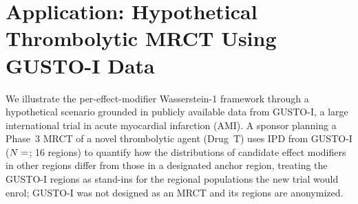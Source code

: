 \documentclass[AMA,Times1COL]{WileyNJDv5}
\begin{document}


\section{Application: Hypothetical Thrombolytic MRCT Using GUSTO-I Data}\label{sec:application}

We illustrate the per-effect-modifier Wasserstein-1 framework through a hypothetical scenario grounded in publicly available data from GUSTO-I, a large international trial in acute myocardial infarction (AMI). A sponsor planning a Phase~3 MRCT of a novel thrombolytic agent (Drug~T) uses IPD from GUSTO-I ($N = \numval{gustoN}$; 16 regions)\cite{gusto1993} to quantify how the distributions of candidate effect modifiers in other regions differ from those in a designated anchor region, treating the GUSTO-I regions as stand-ins for the regional populations the new trial would enrol; GUSTO-I was not designed as an MRCT and its regions are anonymized.
\end{document}
